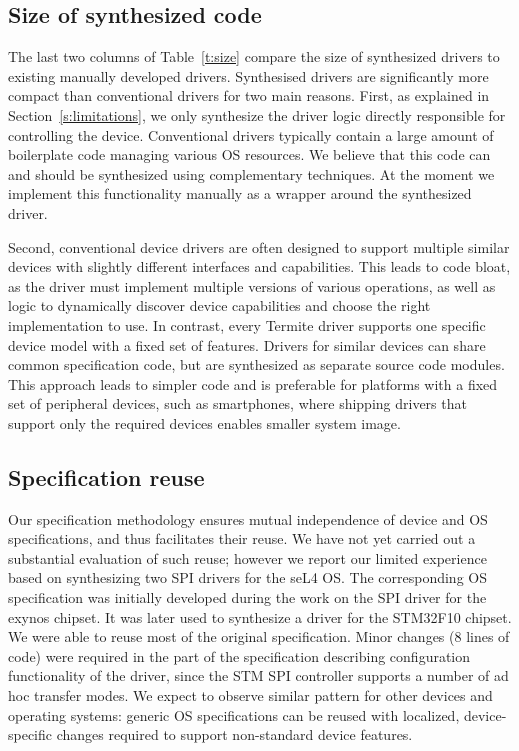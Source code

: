 \documentclass{book}
\newcommand{\termite}{Termite\xspace}
\theoremstyle{definition}
\begin{document}
\subsection{Size of synthesized code} 
The last two columns of Table~\ref{t:size} compare the size of synthesized drivers to existing manually developed drivers.  Synthesised drivers are significantly more compact than conventional drivers for two main reasons.  First, as explained in Section~\ref{s:limitations}, we only synthesize the driver logic directly responsible for controlling the device.  Conventional drivers typically contain a large amount of boilerplate code managing various OS resources.  We believe that this code can and should be synthesized using complementary techniques.  At the moment we implement this functionality manually as a wrapper around the synthesized driver. 

Second, conventional device drivers are often designed to support multiple similar devices with slightly different interfaces and capabilities.  This leads to code bloat, as the driver must implement multiple versions of various operations, as well as logic to dynamically discover device capabilities and choose the right implementation to use.  In contrast, every \termite driver supports one specific device model with a fixed set of features.  Drivers for similar devices can share common specification code, but are synthesized as separate source code modules.  This approach leads to simpler code and is preferable for platforms with a fixed set of peripheral devices, such as smartphones, where shipping drivers that support only the required devices enables smaller system image.
  
\subsection{Specification reuse}  
Our specification methodology ensures mutual independence of device and OS specifications, and thus facilitates their reuse.  We have not yet carried out a substantial evaluation of such reuse; however we report our limited experience based on synthesizing two SPI drivers for the seL4 OS.  The corresponding OS specification was initially developed during the work on the SPI driver for the exynos chipset.  It was later used to synthesize a driver for the STM32F10 chipset.  We were able to reuse most of the original specification.  Minor changes (8 lines of code) were required in the part of the specification describing configuration functionality of the driver, since the STM SPI controller supports a number of ad hoc transfer modes.  We expect to observe similar pattern for other devices and operating systems: generic OS specifications can be reused with localized, device-specific changes required to support non-standard device features.
\end{document}
